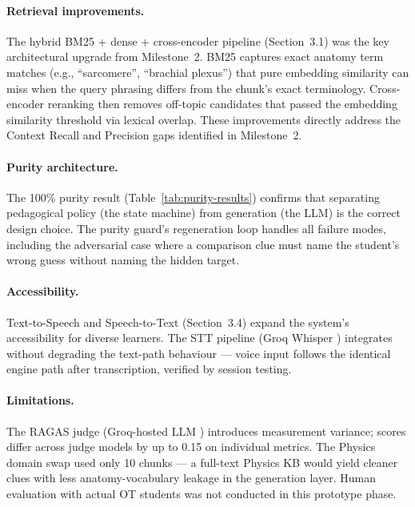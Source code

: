 \documentclass[11pt]{article}
\begin{document}
\paragraph{Retrieval improvements.}
The hybrid BM25 \citep{bm25} + dense + cross-encoder pipeline (Section~3.1)
was the key architectural upgrade from Milestone~2.
BM25 captures exact anatomy term matches (e.g., ``sarcomere'',
``brachial plexus'') that pure embedding similarity can miss when the
query phrasing differs from the chunk's exact terminology.
Cross-encoder reranking then removes off-topic candidates that passed
the embedding similarity threshold via lexical overlap.
These improvements directly address the Context Recall and Precision gaps
identified in Milestone~2.

\paragraph{Purity architecture.}
The 100\% purity result (Table~\ref{tab:purity-results}) confirms that
separating pedagogical policy (the state machine) from generation (the LLM)
is the correct design choice.
The purity guard's regeneration loop handles all failure modes, including
the adversarial case where a comparison clue must name the student's wrong
guess without naming the hidden target.

\paragraph{Accessibility.}
Text-to-Speech and Speech-to-Text (Section~3.4) expand the system's
accessibility for diverse learners.
The STT pipeline (Groq Whisper \citep{whisper}) integrates without degrading
the text-path behaviour --- voice input follows the identical engine path
after transcription, verified by session testing.

\paragraph{Limitations.}
The RAGAS judge (Groq-hosted LLM \citep{groq_docs}) introduces measurement
variance; scores differ across judge models by up to 0.15 on individual
metrics.
The Physics domain swap used only 10 chunks --- a full-text Physics KB
would yield cleaner clues with less anatomy-vocabulary leakage in the
generation layer.
Human evaluation with actual OT students was not conducted in this
prototype phase.

\end{document}
